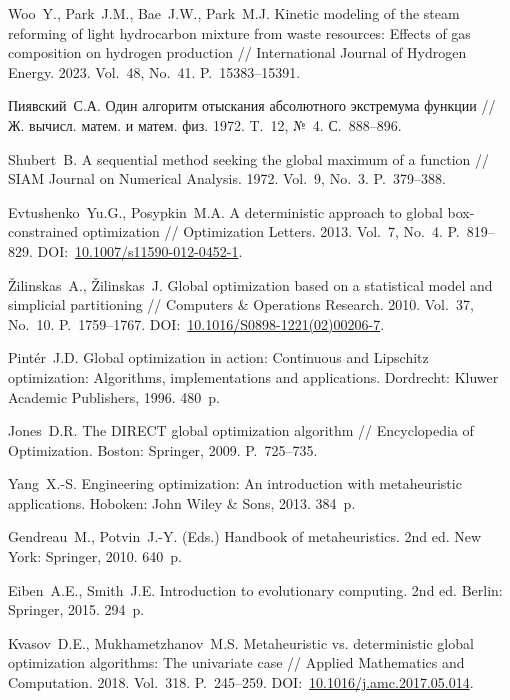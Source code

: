 \documentclass{cmi}
\begin{document}
\begin{biblio}
Woo~Y., Park~J.M., Bae~J.W., Park~M.J. Kinetic modeling of the steam reforming of light hydrocarbon mixture from waste resources: Effects of gas composition on hydrogen production // International Journal of Hydrogen Energy. 2023. Vol.~48, No.~41. P.~15383--15391.

Пиявский~С.А. Один алгоритм отыскания абсолютного экстремума функции // Ж. вычисл. матем. и матем. физ. 1972. T.~12, №~4. С.~888--896.

Shubert~B. A sequential method seeking the global maximum of a function // SIAM Journal on Numerical Analysis. 1972. Vol.~9, No.~3. P.~379--388.

Evtushenko~Yu.G., Posypkin~M.A. A deterministic approach to global box-constrained optimization // Optimization Letters. 2013. Vol.~7, No.~4. P.~819--829. DOI:~\href{http://dx.doi.org/10.1007/s11590-012-0452-1}{10.1007/s11590-012-0452-1}.

Žilinskas~A., Žilinskas~J. Global optimization based on a statistical model and simplicial partitioning // Computers \& Operations Research. 2010. Vol.~37, No.~10. P.~1759--1767. DOI:~\href{http://dx.doi.org/10.1016/S0898-1221(02)00206-7}{10.1016/S0898-1221(02)00206-7}.

Pintér~J.D. Global optimization in action: Continuous and Lipschitz optimization: Algorithms, implementations and applications. Dordrecht: Kluwer Academic Publishers, 1996. 480~p.

Jones~D.R. The DIRECT global optimization algorithm // Encyclopedia of Optimization. Boston: Springer, 2009. P.~725--735.

Yang~X.-S. Engineering optimization: An introduction with metaheuristic applications. Hoboken: John Wiley \& Sons, 2013. 384~p.

Gendreau~M., Potvin~J.-Y. (Eds.) Handbook of metaheuristics. 2nd ed. New York: Springer, 2010. 640~p.

Eiben~A.E., Smith~J.E. Introduction to evolutionary computing. 2nd ed. Berlin: Springer, 2015. 294~p.

Kvasov~D.E., Mukhametzhanov~M.S. Metaheuristic vs. deterministic global optimization algorithms: The univariate case // Applied Mathematics and Computation. 2018. Vol.~318. P.~245--259. DOI:~\href{http://dx.doi.org/10.1016/j.amc.2017.05.014}{10.1016/j.amc.2017.05.014}.


\end{biblio}
\end{document}
